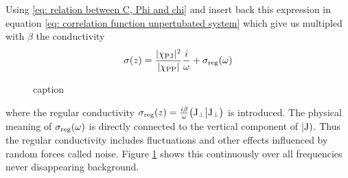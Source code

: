 %
Using \eqref{eq: relation between C, Phi and chi} and insert back this expression in equation \eqref{eq: correlation function unpertubated system} which give us multipled with $\beta$ the conductivity
%
\begin{align}
	\sigma (z) = \frac{\vert\chi_{\mathrm{PJ}}\vert^{2}}{\vert\chi_{\mathrm{PP}}\vert} \frac{i}{\omega}  + \sigma_{\mathrm{reg}}(\omega)
\end{align}
%
%
\begin{figure}[t]
	\caption{caption}
	\label{fig: conductivity broken and unbroken translation symmetry}
\end{figure}
%
where the regular conductivity $\sigma_{\mathrm{reg}}(z) = \frac{i \beta}{\omega} \big({\mathrm{J}_{\bot}}\big|{\mathrm{J}_{\bot}}\big)$ is introduced.
The physical meaning of $\sigma_{\mathrm{reg}}(\omega)$ is directly connected to the vertical component of $|\mathrm{\mathrm{J}})$.
Thus the regular conductivity includes fluctuations and other effects influenced by random forces called noise.
Figure \ref{fig: conductivity broken and unbroken translation symmetry} shows this continuously over all frequencies never disappearing background.

